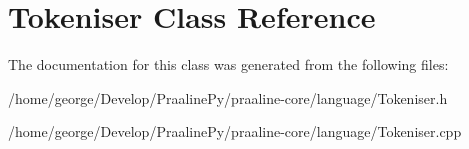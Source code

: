 \hypertarget{class_tokeniser}{}\section{Tokeniser Class Reference}
\label{class_tokeniser}


The documentation for this class was generated from the following files\+:\begin{DoxyCompactItemize}
\item 
/home/george/\+Develop/\+Praaline\+Py/praaline-\/core/language/Tokeniser.\+h\item 
/home/george/\+Develop/\+Praaline\+Py/praaline-\/core/language/Tokeniser.\+cpp\end{DoxyCompactItemize}
